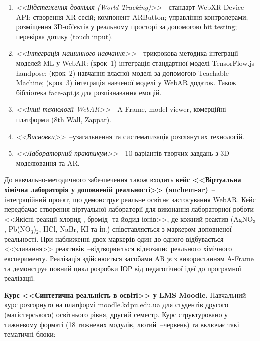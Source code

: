 \begin{enumerate}
\item \textit{<<Відстеження довкілля (World Tracking)>>}~--стандарт WebXR Device API: створення XR-сесій; компонент ARButton; управління контролерами; розміщення 3D-об'єктів у реальному просторі за допомогою hit testing; перевірка дотику (touch input).

\item \textit{<<Інтеграція машинного навчання>>}~--трикрокова методика інтеграції моделей ML у WebAR: (крок~1) інтеграція стандартної моделі TensorFlow.js handpose; (крок~2) навчання власної моделі за допомогою Teachable Machine; (крок~3) інтеграція навченої моделі у WebAR додаток. Також бібліотека face-api.js для розпізнавання емоцій.

\item \textit{<<Інші технології WebAR>>}~--A-Frame, model-viewer, комерційні платформи (8th Wall, Zappar).

\item \textit{<<Висновки>>}~--узагальнення та систематизація розглянутих технологій.

\item \textit{<<Лабораторний практикум>>}~--10 варіантів творчих завдань з 3D-моделювання та AR.
\end{enumerate}

До навчально-методичного забезпечення також входить \textbf{кейс <<Віртуальна хімічна лабораторія у доповненій реальності>> (anchem-ar)}~--інтеграційний проєкт, що демонструє реальне освітнє застосування WebAR. Кейс передбачає створення віртуальної лабораторії для виконання лабораторної роботи <<Якісні реакції хлорид-, бромід- та йодид-іонів>>, де кожний реактив (AgNO$_3$, Pb(NO$_3$)$_2$, HCl, NaBr, KI та ін.) співставляється з маркером доповненої реальності. При наближенні двох маркерів один до одного відбувається <<зливання>> реактивів~--відтворюється відеозапис реального хімічного експерименту. Реалізація здійснюється засобами AR.js з використанням A-Frame та демонструє повний цикл розробки ІОР від педагогічної ідеї до програмної реалізації.

\textbf{Курс <<Синтетична реальність в освіті>> у LMS Moodle.} Навчальний курс розгорнуто на платформі moodle.kdpu.edu.ua для студентів другого (магістерського) освітнього рівня, другий семестр. Курс структуровано у тижневому форматі (18 тижневих модулів, лютий~--червень) та включає такі тематичні блоки:

